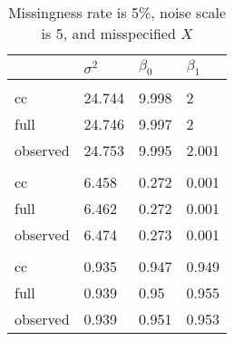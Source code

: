 \documentclass[
  twocolumn]{article}
\begin{document}
\begin{table}[h]
\caption{Missingness rate is 5\%, noise scale is 5, and misspecified $X$}
\begingroup\fontsize{7}{9}\selectfont

\begin{tabu} to 
\toprule
 & $\sigma^2$ & $\beta_0$ & $\beta_1$\\
\midrule
\addlinespace[0.3em]
\\
\hspace{1em}cc & 24.744 & 9.998 & 2\\
\hspace{1em}full & 24.746 & 9.997 & 2\\
\hspace{1em}observed & 24.753 & 9.995 & 2.001\\
\addlinespace[0.3em]
\\
\hspace{1em}cc & 6.458 & 0.272 & 0.001\\
\hspace{1em}full & 6.462 & 0.272 & 0.001\\
\hspace{1em}observed & 6.474 & 0.273 & 0.001\\
\addlinespace[0.3em]
\\
\hspace{1em}cc & 0.935 & 0.947 & 0.949\\
\hspace{1em}full & 0.939 & 0.95 & 0.955\\
\hspace{1em}observed & 0.939 & 0.951 & 0.953\\
\bottomrule
\end{tabu}
\endgroup{}
\end{table}
\end{document}
